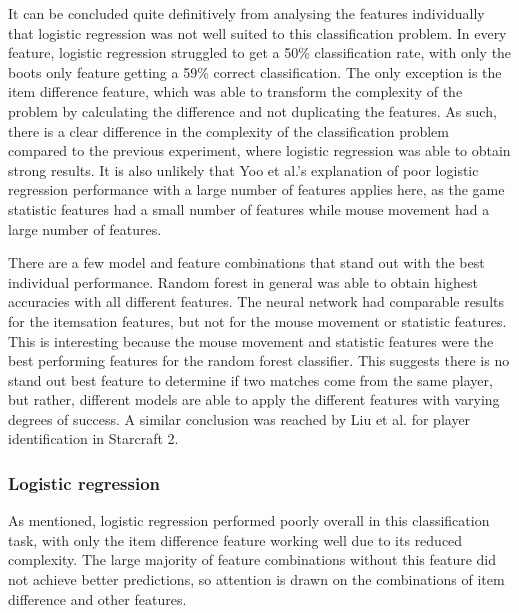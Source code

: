 \documentclass[Report.tex]{subfiles}
\begin{document}
It can be concluded quite definitively from analysing the features individually that logistic regression was not well suited to this classification problem. In every feature, logistic regression struggled to get a 50\% classification rate, with only the boots only feature getting a 59\% correct classification. The only exception is the item difference feature, which was able to transform the complexity of the problem by calculating the difference and not duplicating the features. As such, there is a clear difference in the complexity of the classification problem compared to the previous experiment, where logistic regression was able to obtain strong results. It is also unlikely that Yoo et al.'s explanation of poor logistic regression performance with a large number of features \cite{lr-vs-rf} applies here, as the game statistic features had a small number of features while mouse movement had a large number of features. 


There are a few model and feature combinations that stand out with the best individual performance. Random forest in general was able to obtain highest accuracies with all different features. The neural network had comparable results for the itemsation features, but not for the mouse movement or statistic features. This is interesting because the mouse movement and statistic features were the best performing features for the random forest classifier. This suggests there is no stand out best feature to determine if two matches come from the same player, but rather, different models are able to apply the different features with varying degrees of success. A similar conclusion was reached by Liu et al. \cite{starcraft-identification} for player identification in Starcraft 2. 

\subsubsection{Logistic regression}
As mentioned, logistic regression performed poorly overall in this classification task, with only the item difference feature working well due to its reduced complexity. The large majority of feature combinations without this feature did not achieve better predictions, so attention is drawn on the combinations of item difference and other features. 
\end{document}
